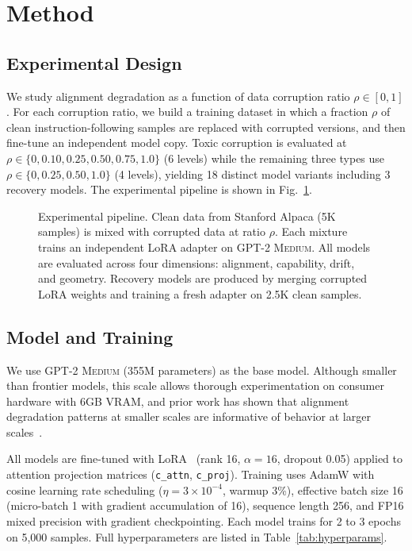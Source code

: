 \documentclass[conference]{IEEEtran}
\newcommand{\model}{\textsc{GPT-2 Medium}}
\begin{document}
\section{Method}
\label{sec:method}

\subsection{Experimental Design}

We study alignment degradation as a function of data corruption ratio $\rho \in [0, 1]$. For each corruption ratio, we build a training dataset in which a fraction $\rho$ of clean instruction-following samples are replaced with corrupted versions, and then fine-tune an independent model copy. Toxic corruption is evaluated at $\rho \in \{0, 0.10, 0.25, 0.50, 0.75, 1.0\}$ (6 levels) while the remaining three types use $\rho \in \{0, 0.25, 0.50, 1.0\}$ (4 levels), yielding 18 distinct model variants including 3 recovery models. The experimental pipeline is shown in Fig.~\ref{fig:pipeline}.

\begin{figure}[htbp]
    \centering
    \caption{Experimental pipeline. Clean data from Stanford Alpaca (5K samples) is mixed with corrupted data at ratio $\rho$. Each mixture trains an independent LoRA adapter on \model{}. All models are evaluated across four dimensions: alignment, capability, drift, and geometry. Recovery models are produced by merging corrupted LoRA weights and training a fresh adapter on 2.5K clean samples.}
    \label{fig:pipeline}
\end{figure}

\subsection{Model and Training}

We use \model{} (355M parameters) as the base model. Although smaller than frontier models, this scale allows thorough experimentation on consumer hardware with 6GB VRAM, and prior work has shown that alignment degradation patterns at smaller scales are informative of behavior at larger scales~\cite{mazeika2025scaling}.

All models are fine-tuned with LoRA~\cite{hu2021lora} (rank 16, $\alpha=16$, dropout 0.05) applied to attention projection matrices (\texttt{c\_attn}, \texttt{c\_proj}). Training uses AdamW with cosine learning rate scheduling ($\eta = 3 \times 10^{-4}$, warmup 3\%), effective batch size 16 (micro-batch 1 with gradient accumulation of 16), sequence length 256, and FP16 mixed precision with gradient checkpointing. Each model trains for 2 to 3 epochs on 5,000 samples. Full hyperparameters are listed in Table~\ref{tab:hyperparams}.
\end{document}

